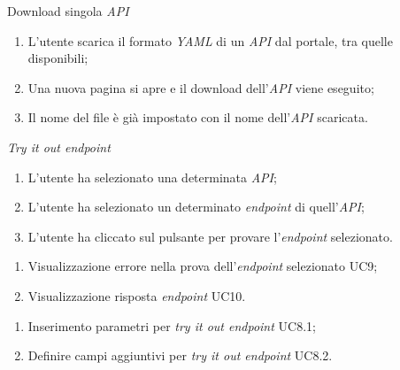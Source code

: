 \begin{usecase}{7}{Download singola \textit{API}}\label{uc:download-singola-api}

    \usecasemain{}
        \begin{enumerate}
            \item L'utente scarica il formato \textit{YAML} di un \textit{API} dal portale, tra quelle disponibili;
            \item Una nuova pagina si apre e il download dell'\textit{API} viene eseguito;
            \item Il nome del file è già impostato con il nome dell'\textit{API} scaricata.
        \end{enumerate}

\end{usecase}


\begin{usecase}{8}{\textit{Try it out endpoint}}\label{uc:try-it-out-endpoint}
    \usecasemain{}
        \begin{enumerate}
            \item L'utente ha selezionato una determinata \textit{API};
            \item L'utente ha selezionato un determinato \textit{endpoint} di quell'\textit{API};
            \item L'utente ha cliccato sul pulsante per provare l'\textit{endpoint} selezionato.
        \end{enumerate}

    \usecaseext{}
        \begin{enumerate}
            \item Visualizzazione errore nella prova dell'\textit{endpoint} selezionato UC9;
            \item Visualizzazione risposta \textit{endpoint} UC10.
        \end{enumerate}

        \begin{enumerate}
            \item Inserimento parametri per \textit{try it out endpoint} UC8.1;
            \item Definire campi aggiuntivi per \textit{try it out endpoint} UC8.2.
        \end{enumerate}

\end{usecase}

